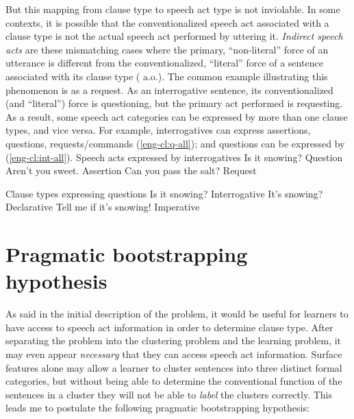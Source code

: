 {But this mapping from clause type to speech act type is not inviolable. In some contexts, it is possible that the conventionalized speech act associated with a clause type is not the actual speech act performed by uttering it. \emph{Indirect speech acts} are these mismatching cases where the primary, ``non-literal'' force of an utterance is different from the conventionalized, ``literal'' force of a sentence associated with its clause type (\citealt{searle1975tax, searle1976class, bachharnish1979, levinson1983, searlevanderveken1985, portner2018, starr2014, murraystarr2020} a.o.). The common example illustrating this phenomenon is  as a request. As an interrogative sentence, its conventionalized (and ``literal'') force is questioning, but the primary act performed is requesting. As a result, some speech act categories can be expressed by more than one clause types, and vice versa. For example, interrogatives can express assertions, questions, requests/commands (\ref{eng-cl:q-all}); and questions can be expressed by \diis{} (\ref{eng-cl:int-all}).
Speech acts expressed by interrogatives 
\bxl Is it snowing? \hfill Question
\ex Aren't you sweet. \hfill Assertion
\ex Can you pass the salt? \hfill Request
\exl
\eex

Clause types expressing questions
\bxl
Is it snowing? \hfill Interrogative
\ex It's snowing? \hfill Declarative
\ex Tell me if it's snowing! \hfill Imperative
\exl
\eex


\section{Pragmatic bootstrapping hypothesis}

As said in the initial description of the problem, it would be useful for learners to have access to speech act information in order to determine clause type. After separating the problem into the clustering problem and the learning problem, it may even appear \emph{necessary} that they can access speech act information. Surface features alone may allow a learner to cluster sentences into three distinct formal categories, but without being able to determine the conventional function of the sentences in a cluster they will not be able to \emph{label} the clusters correctly. This leads me to postulate the following pragmatic bootstrapping hypothesis:

}
